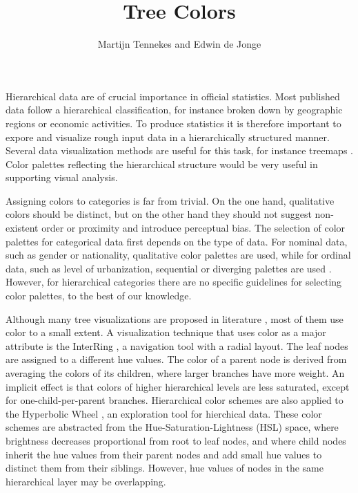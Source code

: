 \documentclass[journal]{vgtc}                %
\title{Tree Colors}
\author{Martijn Tennekes and Edwin de Jonge}
\begin{document}


\maketitle

Hierarchical data are of crucial importance in official statistics. Most published data follow a hierarchical classification, for instance broken down by geographic regions or economic activities. To produce statistics it is therefore important to expore and visualize rough input data in a hierarchically structured manner. Several data visualization methods are useful for this task, for instance treemaps
\cite{shneiderman1992,tennekes2011b}. Color palettes reflecting the hierarchical structure would be very useful in supporting visual analysis.

Assigning colors to categories is far from trivial. On the one hand, qualitative colors should be distinct, but on the other hand they should not suggest non-existent order or proximity and introduce perceptual bias. The selection of color palettes for categorical data first depends on the type of data. For nominal data, such as gender or nationality, qualitative color palettes are used, while for ordinal data, such as level of urbanization, sequential or diverging palettes are used \cite{brewer03, zeileis2009}. However, for hierarchical categories there are no specific guidelines for selecting color palettes, to the best of our knowledge.

Although many tree visualizations are proposed in literature \cite{schulz2011}, most of them use color to a small extent. A visualization technique that uses color as a major attribute is the InterRing \cite{yang2002}, a navigation tool with a radial layout. The leaf nodes are assigned to a different hue values. The color of a parent node is derived from averaging the colors of its children, where larger branches have more weight. An implicit effect is that colors of higher hierarchical levels are less saturated, except for one-child-per-parent branches. Hierarchical color schemes are also applied to the Hyperbolic Wheel \cite{lam2012}, an exploration tool for hierchical data.  These color schemes are abstracted from the Hue-Saturation-Lightness (HSL) space, where brightness decreases proportional from root to leaf nodes, and where child nodes inherit the hue values from their parent nodes and add small hue values to distinct them from their siblings. However, hue values of nodes in the same hierarchical layer may be overlapping.
\end{document}

